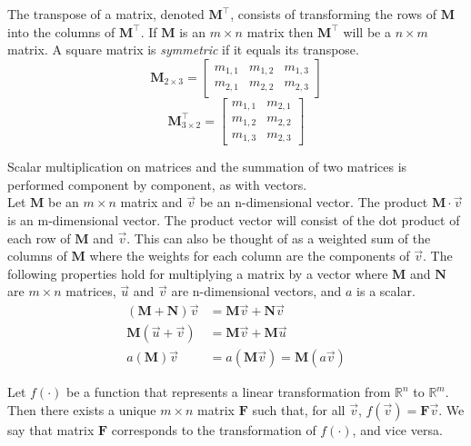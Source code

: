 \documentclass[12pt]{article}
\begin{document}
The transpose of a matrix, denoted $\mathbf{M}^\top$, consists of transforming the rows of $\mathbf{M}$ into the columns of  $\mathbf{M}^\top$. If $\mathbf{M}$ is an $m\times n$ matrix then $\mathbf{M}^\top$ will be a $n\times m$ matrix. A square matrix is \emph{symmetric} if it equals its transpose.\\
\[
\mathbf{M}_{2\times 3}=
\begin{bmatrix}
  m_{1,1} & m_{1,2} & m_{1,3} \\
  m_{2,1} & m_{2,2} & m_{2,3} 
 \end{bmatrix}
 \]
 \[
 \mathbf{M}^\top_{3\times 2}=
\begin{bmatrix}
  m_{1,1} & m_{2,1}  \\
  m_{1,2} & m_{2,2}  \\
  m_{1,3} & m_{2,3}   
 \end{bmatrix}
 \]

Scalar multiplication on matrices and the summation of two matrices is performed component by component, as with vectors. \\

Let $\mathbf{M}$ be an $m\times n$ matrix and $\vec{v}$ be an n-dimensional vector. The product $\mathbf{M}\cdot\vec{v}$ is an m-dimensional vector. The product vector will consist of the dot product of each row of $\mathbf{M}$ and $\vec{v}$. This can also be thought of as a weighted sum of the columns of $\mathbf{M}$ where the weights for each column are the components of $\vec{v}$. The following properties hold for multiplying a matrix by a vector where $\mathbf{M}$ and $\mathbf{N}$ are $m\times n$ matrices, $\vec{u}$ and $\vec{v}$ are n-dimensional vectors, and $a$ is a scalar.
\begin{align*}
(\mathbf{M}+\mathbf{N})\vec{v} &= \mathbf{M}\vec{v}+\mathbf{N}\vec{v} \\
\mathbf{M}(\vec{u}+\vec{v}) &= \mathbf{M}\vec{v} + \mathbf{M}\vec{u} \\
a(\mathbf{M})\vec{v} &= a(\mathbf{M}\vec{v}) = \mathbf{M}(a\vec{v})
\end{align*}

Let $f(\cdot)$ be a function that represents a linear transformation from $\mathbb{R}^n$ to $\mathbb{R}^m$. Then there exists a unique $m\times n$ matrix $\mathbf{F}$ such that, for all $\vec{v}$, $f(\vec{v})=\mathbf{F}\vec{v}$. We say that matrix $\mathbf{F}$ corresponds to the transformation of $f(\cdot)$, and vice versa. \\
\end{document}

